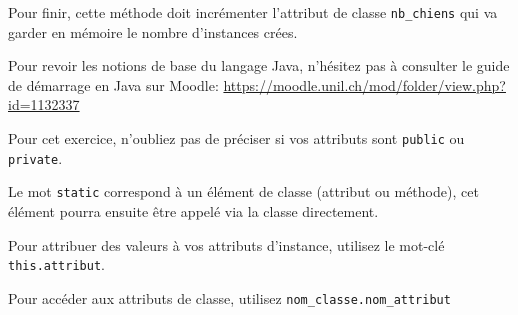 \begin{Exercice}[10 minutes]
   	Pour finir, cette méthode doit incrémenter l'attribut de classe \lstinline{nb_chiens} qui va garder en mémoire le nombre d'instances crées.
   	
\begin{conseil}
    Pour revoir les notions de base du langage Java, n'hésitez pas à consulter le guide de démarrage en Java sur Moodle:
	\url{https://moodle.unil.ch/mod/folder/view.php?id=1132337}

   Pour cet exercice, n'oubliez pas de préciser si vos attributs sont \lstinline{public} ou \lstinline{private}.
   
   Le mot \lstinline{static} correspond à un élément de classe (attribut ou méthode), cet élément pourra ensuite être appelé via la classe directement.
   
   Pour attribuer des valeurs à vos attributs d'instance, utilisez le mot-clé \lstinline{this.attribut}.
   
   Pour accéder aux attributs de classe, utilisez \lstinline{nom_classe.nom_attribut}
\end{conseil}
    
\begin{solution}
	
\end{solution}
\end{Exercice}


